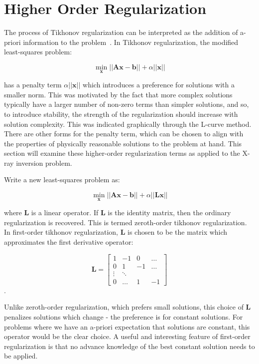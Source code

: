 \section{Higher Order Regularization}

The process of Tikhonov regularization can be interpreted as the addition of a-priori information to the problem~\cite{Tikhonov1995NumericalMF}. In Tikhonov regularization, the modified least-squares problem:

$$\min_{\mathbf{x}} \vert \vert \mathbf{A} \mathbf{x} - \mathbf{b} \vert \vert + \alpha \vert \vert \mathbf{x} \vert \vert$$

has a penalty term  $\alpha \vert \vert \mathbf{x} \vert \vert$ which introduces a preference for solutions with a smaller norm. This was motivated by the fact that more complex solutions typically have a larger number of non-zero terms than simpler solutions, and so, to introduce stability, the strength of the regularization should increase with solution complexity. This was indicated graphically through the L-curve method. There are other forms for the penalty term, which can be chosen to align with the properties of physically reasonable solutions to the problem at hand. This section will examine these higher-order regularization terms as applied to the X-ray inversion problem. 

Write a new least-squares problem as:

$$\min_{\mathbf{x}} \vert \vert \mathbf{A} \mathbf{x} - \mathbf{b} \vert \vert + \alpha \vert \vert \mathbf{L} \mathbf{x} \vert \vert$$

where $\mathbf{L}$ is a linear operator. If $\mathbf{L}$ is the identity matrix, then the ordinary regularization is recovered. This is termed zeroth-order tikhonov regularization. In first-order tikhonov regularization, $\mathbf{L}$ is chosen to be the matrix which approximates the first derivative operator:

\[
\mathbf{L} = \begin{bmatrix} 
    1 & -1 & 0 & \dots \\
    0 & 1 & -1 &\dots \\
    \vdots & \ddots & \\
    0 & \dots & 1 & -1 
    \end{bmatrix}
\].

Unlike zeroth-order regularization, which prefers small solutions, this choice of $\mathbf{L}$ penalizes solutions which change - the preference is for constant solutions. For problems where we have an a-priori expectation that solutions are constant, this operator would be the clear choice. A useful and interesting feature of first-order regularization is that no advance knowledge of the best constant solution needs to be applied. 

